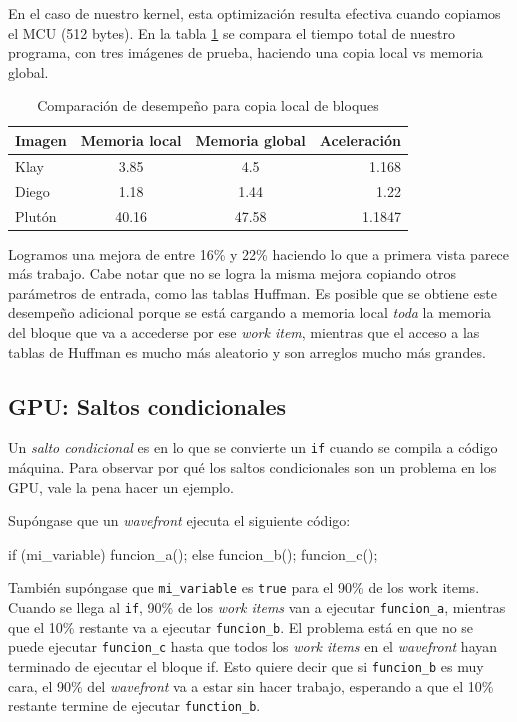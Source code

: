{En el caso de nuestro kernel, esta optimización resulta efectiva cuando
copiamos el \gls{MCU} (512 bytes). En la tabla \ref{table:gpucopy} se compara el tiempo
total de nuestro programa, con tres imágenes de prueba, haciendo una copia
local vs memoria global.

\begin{table}[h]
    \begin{tabular}{ |l c c r| }
        \hline
        Imagen & Memoria local & Memoria global & Aceleración\\
        \hline
        Klay & 3.85 & 4.5 & 1.168 \\
        Diego & 1.18 & 1.44 & 1.22 \\
        Plutón & 40.16 & 47.58 & 1.1847 \\
        \hline
    \end{tabular}
    \caption{Comparación de desempeño para copia local de bloques}
    \label{table:gpucopy}
\end{table}

Logramos una mejora de entre 16\% y 22\% haciendo lo que a primera vista parece
más trabajo. Cabe notar que no se logra la misma mejora copiando otros
parámetros de entrada, como las tablas Huffman. Es posible que se obtiene este
desempeño adicional porque se está cargando a memoria local \emph{toda} la
memoria del bloque que va a accederse por ese \emph{work item}, mientras que el acceso
a las tablas de Huffman es mucho más aleatorio y son arreglos mucho más
grandes.

\subsection{GPU: Saltos condicionales}

Un \emph{ salto condicional } es en lo que se convierte un \verb+if+ cuando se
compila a código máquina. Para observar por qué los saltos condicionales son un
problema en los GPU, vale la pena hacer un ejemplo.

Supóngase que un \emph{wavefront} ejecuta el siguiente código:

\begin{code}[language=C][h]
    if (mi_variable) {
        funcion_a();
    } else {
        funcion_b();
    }
    funcion_c();
\end{code}

También supóngase que \verb+mi_variable+ es \verb+true+ para el 90\% de los work
items.  Cuando se llega al \verb+if+, 90\% de los \emph{work items} van a ejecutar
\verb+funcion_a+, mientras que el 10\% restante va a ejecutar \verb+funcion_b+.
El problema está en que no se puede ejecutar \verb+funcion_c+ hasta que todos
los \emph{work items} en el \emph{wavefront} hayan terminado de ejecutar el bloque if. Esto
quiere decir que si \verb+funcion_b+ es muy cara, el 90\% del \emph{wavefront} va a
estar sin hacer trabajo, esperando a que el 10\% restante termine de ejecutar
\verb+function_b+.

}
